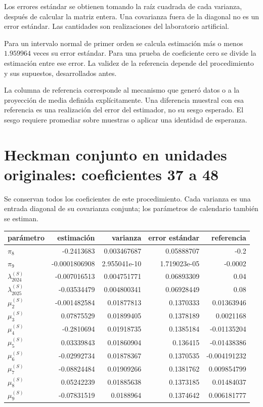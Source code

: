 \documentclass[11pt,a4paper]{article}
\begin{document}
Los errores estándar se obtienen tomando la raíz cuadrada de cada varianza, después de calcular la matriz entera. Una covarianza fuera de la diagonal no es un error estándar. Las cantidades son realizaciones del laboratorio artificial.

Para un intervalo normal de primer orden se calcula estimación más o menos $1.959964$ veces su error estándar. Para una prueba de coeficiente cero se divide la estimación entre ese error. La validez de la referencia depende del procedimiento y sus supuestos, desarrollados antes.

La columna de referencia corresponde al mecanismo que generó datos o a la proyección de media definida explícitamente. Una diferencia muestral con esa referencia es una realización del error del estimador, no su sesgo esperado. El sesgo requiere promediar sobre muestras o aplicar una identidad de esperanza.

\clearpage
\section{Heckman conjunto en unidades originales: coeficientes 37 a 48}
Se conservan todos los coeficientes de este procedimiento. Cada varianza es una entrada diagonal de su covarianza conjunta; los parámetros de calendario también se estiman.
\begin{center}\small
\begin{tabular}{lrrrr}
\toprule
parámetro & estimación & varianza & error estándar & referencia\\\midrule
$\pi_8$ & -0.2413683 & 0.003467687 & 0.05888707 & -0.2\\
$\pi_9$ & -0.0001806908 & 2.955041e-10 & 1.719023e-05 & -0.0002\\
$\lambda_{2024}^{(S)}$ & -0.007016513 & 0.004751771 & 0.06893309 & 0.04\\
$\lambda_{2025}^{(S)}$ & -0.03534479 & 0.004800341 & 0.06928449 & 0.08\\
$\mu_2^{(S)}$ & -0.001482584 & 0.01877813 & 0.1370333 & 0.01363946\\
$\mu_3^{(S)}$ & 0.07875529 & 0.01899405 & 0.1378189 & 0.0021168\\
$\mu_4^{(S)}$ & -0.2810694 & 0.01918735 & 0.1385184 & -0.01135204\\
$\mu_5^{(S)}$ & 0.03339843 & 0.01860904 & 0.136415 & -0.01438386\\
$\mu_6^{(S)}$ & -0.02992734 & 0.01878367 & 0.1370535 & -0.004191232\\
$\mu_7^{(S)}$ & -0.08824484 & 0.01909266 & 0.1381762 & 0.009854799\\
$\mu_8^{(S)}$ & 0.05242239 & 0.01885638 & 0.1373185 & 0.01484037\\
$\mu_9^{(S)}$ & -0.07831519 & 0.0188964 & 0.1374642 & 0.006181777\\
\bottomrule
\end{tabular}\end{center}
\end{document}

